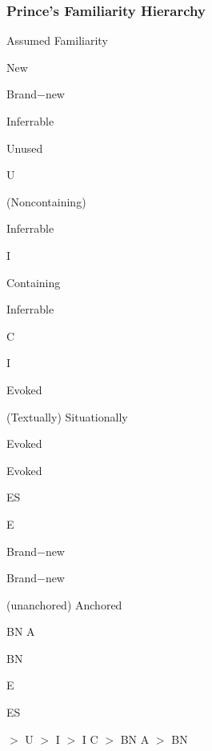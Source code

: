 \documentclass[compress,color=usenames]{beamer}
\begin{document}
\begin{frame}
\frametitle{
Prince's Familiarity Hierarchy}



Assumed Familiarity






New






Brand$-$new






Inferrable






Unused



U






(Noncontaining)



Inferrable



I






Containing



Inferrable



C



I






Evoked






(Textually) Situationally



Evoked



Evoked



ES



E






Brand$-$new



Brand$-$new



(unanchored) Anchored



BN A



BN






E



ES


$>$ U $>$ I $>$ I C $>$ BN A $>$ BN














\end{frame}
\end{document}
